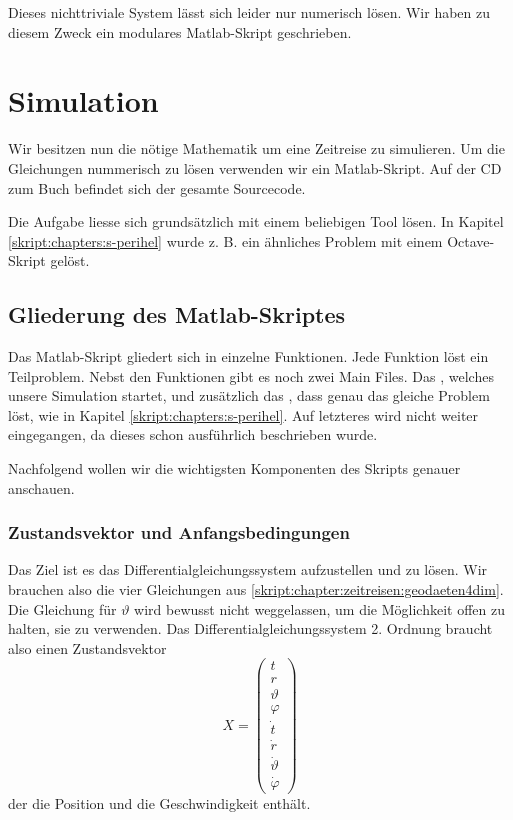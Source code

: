 \begin{refsection}
	Dieses nichttriviale System lässt sich leider nur numerisch lösen. Wir haben zu diesem Zweck ein modulares Matlab-Skript geschrieben. 
		
	\section{Simulation}
    
    Wir besitzen nun die nötige Mathematik um eine Zeitreise zu simulieren. Um die Gleichungen nummerisch zu lösen verwenden wir ein Matlab-Skript. Auf der CD zum Buch befindet sich der gesamte Sourcecode. 
    
    Die Aufgabe liesse sich grundsätzlich mit einem beliebigen Tool lösen. In Kapitel \ref{skript:chapters:s-perihel} wurde z. B. ein ähnliches Problem mit einem Octave-Skript gelöst. 

    \subsection{Gliederung des Matlab-Skriptes}
    Das Matlab-Skript gliedert sich in einzelne Funktionen. Jede Funktion löst ein Teilproblem. Nebst den Funktionen gibt es noch zwei Main Files. Das , welches unsere Simulation startet, und zusätzlich das , dass genau das gleiche Problem löst, wie in Kapitel \ref{skript:chapters:s-perihel}. Auf letzteres wird nicht weiter eingegangen, da dieses schon ausführlich beschrieben wurde.
    
    Nachfolgend wollen wir die wichtigsten Komponenten des Skripts genauer anschauen.

    \subsubsection{Zustandsvektor und Anfangsbedingungen}
    Das Ziel ist es das Differentialgleichungssystem aufzustellen und zu lösen. Wir brauchen also die vier Gleichungen aus \ref{skript:chapter:zeitreisen:geodaeten4dim}. Die Gleichung für $\vartheta$ wird bewusst nicht weggelassen, um die Möglichkeit offen zu halten, sie zu verwenden. 
    Das Differentialgleichungssystem 2. Ordnung braucht also einen Zustandsvektor
    \[
    X=\begin{pmatrix}
    t\\r\\\vartheta\\\varphi \\\dot t\\\dot r\\\dot \vartheta\\\dot\varphi
    \end{pmatrix}
    \]
    der die Position und die Geschwindigkeit enthält.
    

\end{refsection}

